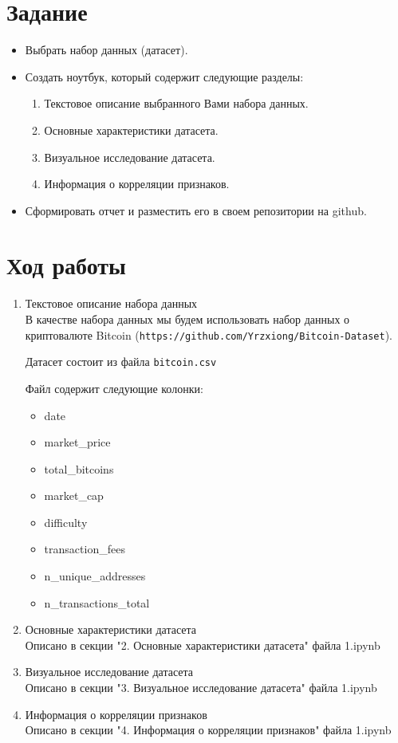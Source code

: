 \documentclass[a4paper]{article}
\begin{document}
  \section*{Задание}
  \begin{itemize}
    \item Выбрать набор данных (датасет).
    \item Создать ноутбук, который содержит следующие разделы:
    \begin{enumerate}
      \item Текстовое описание выбранного Вами набора данных.
      \item Основные характеристики датасета.
      \item Визуальное исследование датасета.
      \item Информация о корреляции признаков.
    \end{enumerate}
    \item Сформировать отчет и разместить его в своем репозитории на github.
  \end{itemize}

  \section*{Ход работы}
  \begin{enumerate}
    \item Текстовое описание набора данных \\
    В качестве набора данных мы будем использовать набор данных о криптовалюте Bitcoin
    (\texttt{https://github.com/Yrzxiong/Bitcoin-Dataset}).

    Датасет состоит из файла \texttt{bitcoin.csv}

    Файл содержит следующие колонки:
    \begin{itemize}
    \item date
    \item market\_price
    \item total\_bitcoins
    \item market\_cap
    \item difficulty
    \item transaction\_fees
    \item n\_unique\_addresses
    \item n\_transactions\_total
    \end{itemize}

    \item Основные характеристики датасета \\
      Описано в секции "2. Основные характеристики датасета" файла 1.ipynb
    \item Визуальное исследование датасета \\
      Описано в секции "3. Визуальное исследование датасета" файла 1.ipynb
    \item Информация о корреляции признаков \\
      Описано в секции "4. Информация о корреляции признаков" файла 1.ipynb
  \end{enumerate}
\end{document}
